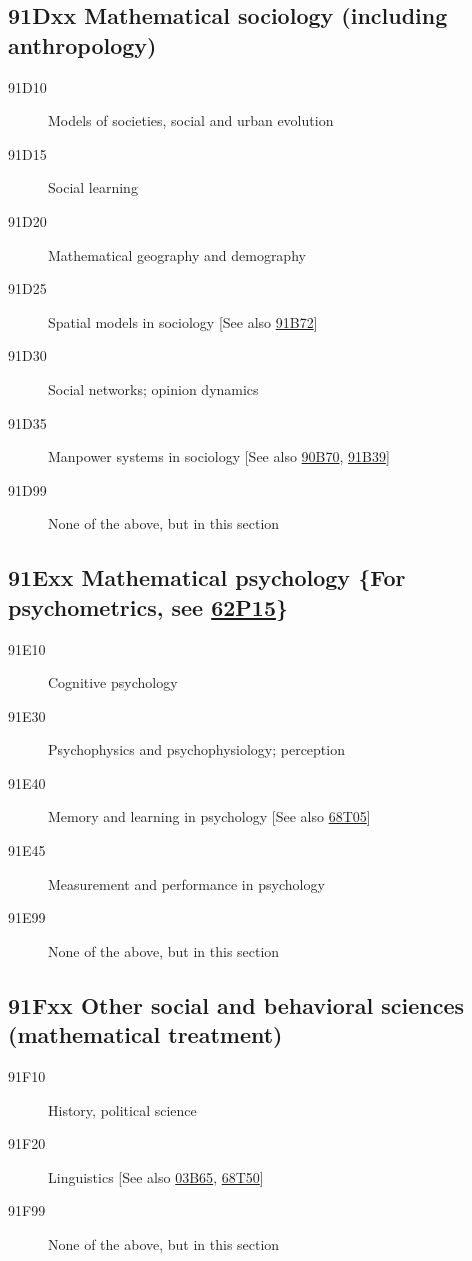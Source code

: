 \subsection*{91Dxx  Mathematical sociology (including anthropology) }\label{91Dxx}
\begin{description}  
\item [91D10]\label{91D10} Models of societies, social and urban evolution
\item [91D15]\label{91D15} Social learning
\item [91D20]\label{91D20} Mathematical geography and demography
\item [91D25]\label{91D25} Spatial models in sociology [See also \hyperref[91B72]{91B72}]
\item [91D30]\label{91D30} Social networks; opinion dynamics
\item [91D35]\label{91D35} Manpower systems in sociology [See also \hyperref[90B70]{90B70}, \hyperref[91B39]{91B39}]
\item [91D99]\label{91D99} None of the above, but in this section
\end{description}
\subsection*{91Exx  Mathematical psychology \{For psychometrics, see \hyperref[62P15]{62P15}\} }\label{91Exx}
\begin{description}  
\item [91E10]\label{91E10} Cognitive psychology
\item [91E30]\label{91E30} Psychophysics and psychophysiology; perception
\item [91E40]\label{91E40} Memory and learning in psychology [See also \hyperref[68T05]{68T05}]
\item [91E45]\label{91E45} Measurement and performance in psychology
\item [91E99]\label{91E99} None of the above, but in this section
\end{description}
\subsection*{91Fxx  Other social and behavioral sciences (mathematical treatment) }\label{91Fxx}
\begin{description}  
\item [91F10]\label{91F10} History, political science
\item [91F20]\label{91F20} Linguistics [See also \hyperref[03B65]{03B65}, \hyperref[68T50]{68T50}]
\item [91F99]\label{91F99} None of the above, but in this section
\end{description}
